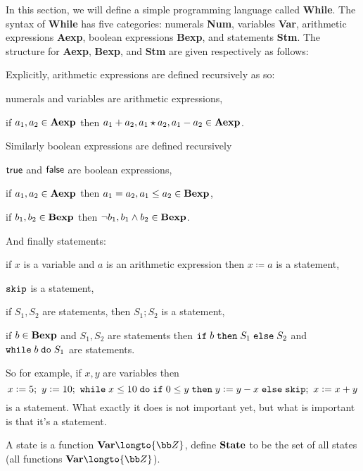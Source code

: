 In this section, we will define a simple programming language called {\bf While}.
The syntax of {\bf While} has five categories: numerals {\bf Num}, variables {\bf Var}, arithmetic expressions {\bf Aexp}, boolean expressions {\bf Bexp}, and statements {\bf Stm}.
The structure for {\bf Aexp}, {\bf Bexp}, and {\bf Stm} are given respectively as follows:

\medskip
\centerline{\vbox{\jot{}}}

Explicitly, arithmetic expressions are defined recursively as so:
\benum
    \item numerals and variables are arithmetic expressions,
    \item if $a_1,a_2\in{\bf Aexp}$ then $a_1+a_2,a_1\star a_2,a_1-a_2\in{\bf Aexp}$.
\eenum

Similarly boolean expressions are defined recursively
\benum
    \item ${\sf true}$ and ${\sf false}$ are boolean expressions,
    \item if $a_1,a_2\in{\bf Aexp}$ then $a_1=a_2,a_1\leq a_2\in{\bf Bexp}$,
    \item if $b_1,b_2\in{\bf Bexp}$ then $\neg b_1,b_1\land b_2\in{\bf Bexp}$.
\eenum

And finally statements:
\benum
    \item if $x$ is a variable and $a$ is an arithmetic expression then $x\coloneqq a$ is a statement,
    \item ${\tt skip}$ is a statement,
    \item if $S_1,S_2$ are statements, then $S_1;S_2$ is a statement,
    \item if $b\in{\bf Bexp}$ and $S_1,S_2$ are statements then $\ifelse b{S_1}{S_2}$ and $\whiledo b{S_1}$ are statements.
\eenum

So for example, if $x,y$ are variables then
$$ x\coloneqq5;\ y\coloneqq10;\ \whiledo{x\leq10}{\ifelse{0\leq y}{y\coloneqq y-x}{{\tt skip}};\ x\coloneqq x+y} $$
is a statement.
What exactly it does is not important yet, but what is important is that it's a statement.

\bdefn

    A {\emphcolor state} is a function ${\bf Var}\longto{\bb Z}$, define ${\bf State}$ to be the set of all states (all functions ${\bf Var}\longto{\bb Z}$).

